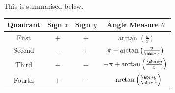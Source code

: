\documentclass{article}
\begin{document}
This is summarised below.
\begin{table}[H]
    \centering
    \begin{tabular}{c c c c}
        \toprule
        \textbf{Quadrant} & \textbf{Sign} \(x\) & \textbf{Sign} \(y\) & \textbf{Angle Measure} \(\theta\)                      \\
        \midrule
        First             & \({}+{}\)           & \({}+{}\)           & \(\arctan{\left( \frac{y}{x} \right)}\)                \\
        Second            & \({}-{}\)           & \({}+{}\)           & \(\pi - \arctan{\left( \frac{y}{\abs*{x}} \right)}\)   \\
        Third             & \({}-{}\)           & \({}-{}\)           & \(-\pi + \arctan{\left( \frac{\abs*{y}}{x} \right)}\)  \\
        Fourth            & \({}+{}\)           & \({}-{}\)           & \(-\arctan{\left( \frac{\abs*{y}}{\abs*{x}} \right)}\) \\
        \bottomrule
    \end{tabular}
\end{table}
\end{document}

